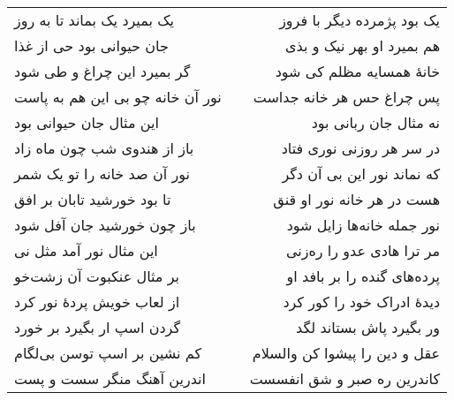 \begin{center}
\begin{longtable}{l p{0.5cm} r}
\\
یک بمیرد یک بماند تا به روز
&&
یک بود پژمرده دیگر با فروز
\\
جان حیوانی بود حی از غذا
&&
هم بمیرد او بهر نیک و بذی
\\
گر بمیرد این چراغ و طی شود
&&
خانهٔ همسایه مظلم کی شود
\\
نور آن خانه چو بی این هم به پاست
&&
پس چراغ حس هر خانه جداست
\\
این مثال جان حیوانی بود
&&
نه مثال جان ربانی بود
\\
باز از هندوی شب چون ماه زاد
&&
در سر هر روزنی نوری فتاد
\\
نور آن صد خانه را تو یک شمر
&&
که نماند نور این بی آن دگر
\\
تا بود خورشید تابان بر افق
&&
هست در هر خانه نور او قنق
\\
باز چون خورشید جان آفل شود
&&
نور جمله خانه‌ها زایل شود
\\
این مثال نور آمد مثل نی
&&
مر ترا هادی عدو را ره‌زنی
\\
بر مثال عنکبوت آن زشت‌خو
&&
پرده‌های گنده را بر بافد او
\\
از لعاب خویش پردهٔ نور کرد
&&
دیدهٔ ادراک خود را کور کرد
\\
گردن اسپ ار بگیرد بر خورد
&&
ور بگیرد پاش بستاند لگد
\\
کم نشین بر اسپ توسن بی‌لگام
&&
عقل و دین را پیشوا کن والسلام
\\
اندرین آهنگ منگر سست و پست
&&
کاندرین ره صبر و شق انفسست
\\
\end{longtable}
\end{center}
